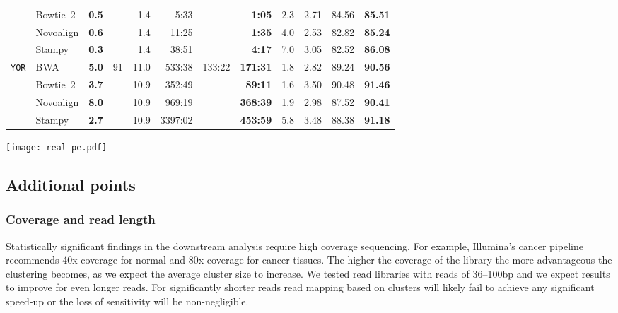 \documentclass[a4paper]{article}
\begin{document}
\begin{table*}
\begin{tabular}{llcrrrrrccrr}
& \multirow{1}{*}{Bowtie~2}	& {\bf 0.5} && 1.4 &  5:33 && {\bf 1:05} & 2.3 & 2.71 & 84.56 & {\bf 85.51} \\
& \multirow{1}{*}{Novoalign} 	& {\bf 0.6} && 1.4 & 11:25 && {\bf 1:35} & 4.0 & 2.53 & 82.82 & {\bf 85.24} \\
& \multirow{1}{*}{Stampy}    	& {\bf 0.3} && 1.4 & 38:51 && {\bf 4:17} & 7.0 & 3.05 & 82.52 & {\bf 86.08}\\
\hline	
\multirow{4}{*}{\tt YOR}
& \multirow{1}{*}{BWA}       	& {\bf 5.0} &\multirow{4}{*}{91}& 11.0 & 533:38 &\multirow{4}{*}{133:22}& {\bf 171:31} & 1.8 & 2.82 & 89.24 & {\bf 90.56}\\
& \multirow{1}{*}{Bowtie~2}   	& {\bf 3.7} && 10.9 &  352:49 &&  {\bf 89:11} & 1.6 & 3.50 & 90.48 & {\bf 91.46}\\
& \multirow{1}{*}{Novoalign} 	& {\bf 8.0} && 10.9 &  969:19 && {\bf 368:39} & 1.9 & 2.98 & 87.52 & {\bf 90.41}\\
& \multirow{1}{*}{Stampy}    	& {\bf 2.7} && 10.9 & 3397:02 && {\bf 453:59} & 5.8 & 3.48 & 88.38 & {\bf 91.18}\\
\bottomrule 
\end{tabular}
    \end{table*}


    
    \begin{figure*}
  \centering
  \texttt{[image: real-pe.pdf]} 
  \caption{ \label{fig:real}
  {\bf Alternate mapping rate between clustered and individual paired-end read mapping.} Alternate mapping rate is shown as a function of MAPQ threshold. Maximum reported MAPQ value varies between readmappers; for BWA, Bowtie 2, Novoalign and Stampy maximum reported MAPQ for single-end reads are respectively 60, 42, 159 and 99. The cutoffs used to report alternate mapping rate in Table~\ref{runtime-pe} are shown with diamond signs in the inset figures.}
\end{figure*}





\subsection*{Additional points}

\subsubsection*{Coverage and read length} 
Statistically significant
findings in the downstream analysis require high coverage sequencing.
For example, Illumina's cancer pipeline recommends 40x coverage for
normal and 80x coverage for cancer tissues. The higher the coverage of
the library the more advantageous the clustering becomes, as we expect
the average cluster size to increase.  We tested read libraries with
reads of 36--100bp and we expect results to improve for even longer
reads. For significantly shorter reads read mapping based on clusters
will likely fail to achieve any significant speed-up or 
the loss of sensitivity will be non-negligible.
\end{document}
